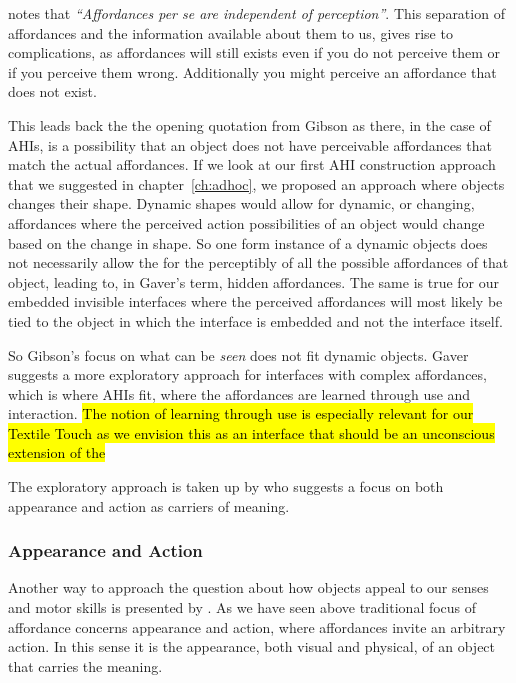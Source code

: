 \citet{gaver1991technology} notes that \emph{``Affordances per se are independent of perception''}.
This separation of affordances and the information available about them to us, gives rise to complications, as affordances will still exists even if you do not perceive them or if you perceive them wrong.
Additionally you might perceive an affordance that does not exist.

This leads back the the opening quotation from Gibson as there, in the case of AHIs, is a possibility that an object does not have perceivable affordances that match the actual affordances.
If we look at our first AHI construction approach that we suggested in chapter~\ref{ch:adhoc}, we proposed an approach where objects changes their shape.
Dynamic shapes would allow for dynamic, or changing, affordances where the perceived action possibilities of an object would change based on the change in shape.
So one form instance of a dynamic objects does not necessarily allow the for the perceptibly of all the possible affordances of that object, leading to, in Gaver's term, hidden affordances. 
The same is true for our embedded invisible interfaces where the perceived affordances will most likely be tied to the object in which the interface is embedded and not the interface itself.

So Gibson's focus on what can be \emph{seen} does not fit dynamic objects.
Gaver suggests a more exploratory approach for interfaces with complex affordances, which is where AHIs fit, where the affordances are learned through use and interaction.
\hl{The notion of learning through use is especially relevant for our Textile Touch as we envision this as an interface that should be an unconscious extension of the }

The exploratory approach is taken up by \citet{djajadiningrat2004tangible} who suggests a focus on both appearance and action as carriers of meaning.

\subsubsection{Appearance and Action}
Another way to approach the question about how objects appeal to our senses and motor skills is presented by \citet{djajadiningrat2004tangible}.
As we have seen above traditional focus of affordance concerns appearance and action, where affordances invite an arbitrary action. 
In this sense it is the appearance, both visual and physical, of an object that carries the meaning.

